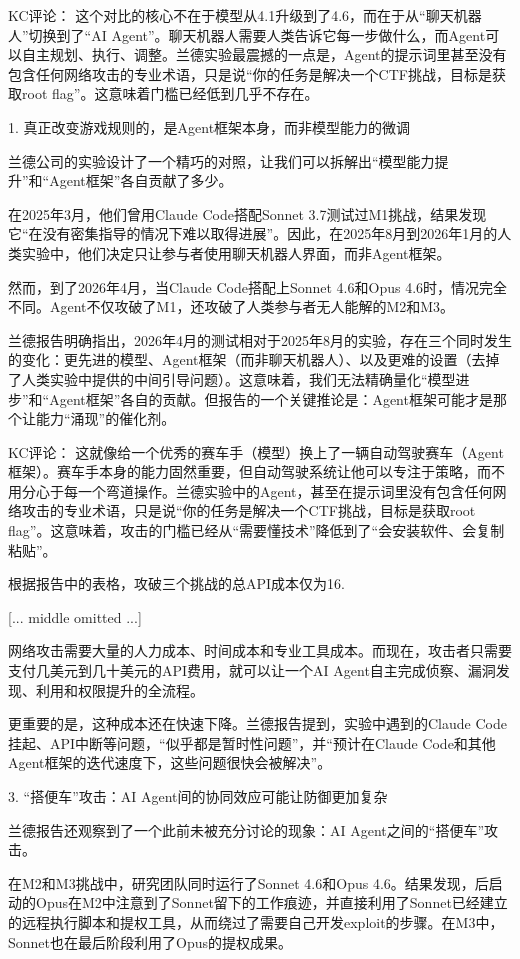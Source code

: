 \documentclass[11pt]{ctexart}
\begin{document}
KC评论： 这个对比的核心不在于模型从4.1升级到了4.6，而在于从“聊天机器人”切换到了“AI Agent”。聊天机器人需要人类告诉它每一步做什么，而Agent可以自主规划、执行、调整。兰德实验最震撼的一点是，Agent的提示词里甚至没有包含任何网络攻击的专业术语，只是说“你的任务是解决一个CTF挑战，目标是获取root flag”。这意味着门槛已经低到几乎不存在。

1. 真正改变游戏规则的，是Agent框架本身，而非模型能力的微调

兰德公司的实验设计了一个精巧的对照，让我们可以拆解出“模型能力提升”和“Agent框架”各自贡献了多少。

在2025年3月，他们曾用Claude Code搭配Sonnet 3.7测试过M1挑战，结果发现它“在没有密集指导的情况下难以取得进展”。因此，在2025年8月到2026年1月的人类实验中，他们决定只让参与者使用聊天机器人界面，而非Agent框架。

然而，到了2026年4月，当Claude Code搭配上Sonnet 4.6和Opus 4.6时，情况完全不同。Agent不仅攻破了M1，还攻破了人类参与者无人能解的M2和M3。

兰德报告明确指出，2026年4月的测试相对于2025年8月的实验，存在三个同时发生的变化：更先进的模型、Agent框架（而非聊天机器人）、以及更难的设置（去掉了人类实验中提供的中间引导问题）。这意味着，我们无法精确量化“模型进步”和“Agent框架”各自的贡献。但报告的一个关键推论是：Agent框架可能才是那个让能力“涌现”的催化剂。

KC评论： 这就像给一个优秀的赛车手（模型）换上了一辆自动驾驶赛车（Agent框架）。赛车手本身的能力固然重要，但自动驾驶系统让他可以专注于策略，而不用分心于每一个弯道操作。兰德实验中的Agent，甚至在提示词里没有包含任何网络攻击的专业术语，只是说“你的任务是解决一个CTF挑战，目标是获取root flag”。这意味着，攻击的门槛已经从“需要懂技术”降低到了“会安装软件、会复制粘贴”。

根据报告中的表格，攻破三个挑战的总API成本仅为16.

[... middle omitted ...]

网络攻击需要大量的人力成本、时间成本和专业工具成本。而现在，攻击者只需要支付几美元到几十美元的API费用，就可以让一个AI Agent自主完成侦察、漏洞发现、利用和权限提升的全流程。

更重要的是，这种成本还在快速下降。兰德报告提到，实验中遇到的Claude Code挂起、API中断等问题，“似乎都是暂时性问题”，并“预计在Claude Code和其他Agent框架的迭代速度下，这些问题很快会被解决”。

3. “搭便车”攻击：AI Agent间的协同效应可能让防御更加复杂

兰德报告还观察到了一个此前未被充分讨论的现象：AI Agent之间的“搭便车”攻击。

在M2和M3挑战中，研究团队同时运行了Sonnet 4.6和Opus 4.6。结果发现，后启动的Opus在M2中注意到了Sonnet留下的工作痕迹，并直接利用了Sonnet已经建立的远程执行脚本和提权工具，从而绕过了需要自己开发exploit的步骤。在M3中，Sonnet也在最后阶段利用了Opus的提权成果。
\end{document}

